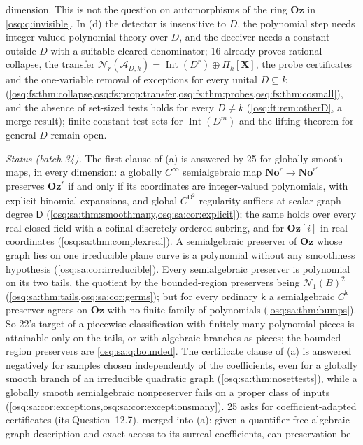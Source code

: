 \documentclass[11pt,letterpaper]{article}
\numberwithin{equation}{section}
\theoremstyle{definition}
\theoremstyle{remark}
\theoremstyle{plain}
\newcommand{\No}{\mathbf{No}}
\newcommand{\Oz}{\mathbf{Oz}}
\newcommand{\GOz}{\Oz[i]}
\newcommand{\A}{\mathcal A}          %
\newcommand{\Int}{\operatorname{Int}}
\newcommand{\Num}{\mathscr N}
\begin{document}
dimension. This is not the question on automorphisms of the ring $\Oz$ in \cref{osq:q:invisible}. In (d) the detector is insensitive to $D$, the
polynomial step needs integer-valued polynomial theory over $D$, and the deceiver needs a constant outside $D$ with a suitable cleared denominator;
16 already proves rational collapse, the transfer $\Num_r(\A_{D,k})=\Int(D^r)\oplus\Pi_k[\mathbf X]$, the probe certificates and the one-variable
removal of exceptions for every unital $D\subseteq k$ (\cref{osq:fs:thm:collapse,osq:fs:prop:transfer,osq:fs:thm:probes,osq:fs:thm:cosmall}), and the
absence of set-sized tests holds for every $D\ne k$ (\cref{osq:ft:rem:otherD}, a merge result); finite constant test sets for $\Int(D^m)$ and the
lifting theorem for general $D$ remain open.

\emph{Status (batch 34).} The first clause of (a) is answered by 25 for globally smooth maps, in every dimension: a globally $C^\infty$ semialgebraic
map $\No^r\to\No^{r'}$ preserves $\Oz^r$ if and only if its coordinates are integer-valued polynomials, with explicit binomial expansions, and global
$C^{\mathsf D^2}$ regularity suffices at scalar graph degree $\mathsf D$ (\cref{osq:sa:thm:smoothmany,osq:sa:cor:explicit}); the same holds over every real
closed field with a cofinal discretely ordered subring, and for $\GOz$ in real coordinates (\cref{osq:sa:thm:complexreal}). A semialgebraic preserver of $\Oz$
whose graph lies on one irreducible plane curve is a polynomial without any smoothness hypothesis (\cref{osq:sa:cor:irreducible}). Every semialgebraic preserver is polynomial
on its two tails, the quotient by the bounded-region preservers being $\Num_1(B)^2$ (\cref{osq:sa:thm:tails,osq:sa:cor:germs}); but for every ordinary
$\mathsf k$ a semialgebraic $C^{\mathsf k}$ preserver agrees on $\Oz$ with no finite family of polynomials (\cref{osq:sa:thm:bumps}). So 22's target
of a piecewise classification with finitely many polynomial pieces is attainable only on the tails, or with algebraic branches as pieces; the
bounded-region preservers are \cref{osq:sa:q:bounded}. The certificate clause of (a) is answered negatively for samples chosen independently of the
coefficients, even for a globally smooth branch of an irreducible quadratic graph (\cref{osq:sa:thm:nosettests}), while a globally smooth semialgebraic
nonpreserver fails on a proper class of inputs (\cref{osq:sa:cor:exceptions,osq:sa:cor:exceptionsmany}). 25 asks for coefficient-adapted certificates
(its Question~12.7), merged into (a): given a quantifier-free algebraic graph description and exact access to its surreal coefficients, can preservation be
\end{document}
